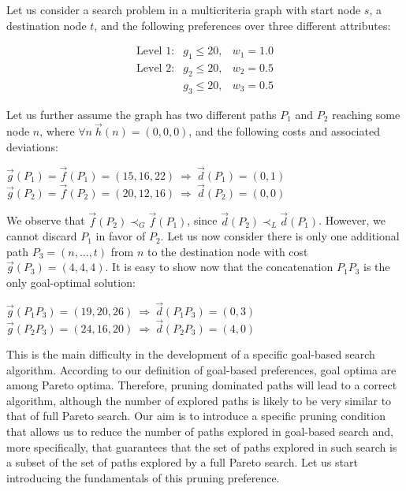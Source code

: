 \begin{ejemplo}\label{ej:ejemplo-pruning1}
Let us consider a search problem in a multicriteria graph with start node $s$, a destination node $t$, and the following preferences over three different attributes:

   \begin{equation}
     \begin{array}{ccc}
       \textrm{Level 1:} & g_{1} \leq 20, & w_1 = 1.0 \\
       \textrm{Level 2:} & g_{2} \leq 20, & w_2 = 0.5 \\ 
                         & g_{3} \leq 20, & w_3 = 0.5 
     \end{array}
   \end{equation}

   Let us further assume the graph has two different paths $P_{1}$ and $P_{2}$ reaching some node $n$, where $\forall n \ \vec{h}(n) = (0, 0, 0)$, and the following costs and associated deviations:

   \begin{center}
   $\vec{g}(P_{1}) = \vec{f}(P_{1}) = (15, 16, 22) \ \Rightarrow
     \ \vec{d}(P_{1}) = (0,1)$ \\ 
   $\vec{g}(P_{2}) = \vec{f}(P_{2}) = (20, 12, 16) \ \Rightarrow
     \ \vec{d}(P_{2}) = (0,0)$ \\ 
   \end{center}

   We observe that $\vec{f}(P_{2}) \prec_{G} \vec{f}(P_{1})$, since $\vec{d}(P_{2}) \prec_{L} \vec{d}(P_{1})$. However, we cannot discard $P_1$ in favor of $P_2$. Let us now consider there is only one additional path $P_{3} = (n, \ldots, t)$ from $n$ to the destination node with cost $\vec g(P_3) = (4, 4, 4)$. It is easy to show now that the concatenation $P_1P_3$ is the only goal-optimal solution:

   \begin{center}
   $\vec{g}(P_{1}P_3) = (19, 20, 26) \ \Rightarrow
     \ \vec{d}(P_{1}P_3) = (0,3)$ \\ 
   $\vec{g}(P_{2}P_3) = (24, 16, 20) \ \Rightarrow
     \ \vec{d}(P_{2}P_3) = (4,0)$ \\ 
   \end{center}
\end{ejemplo} 

This is the main difficulty in the development of a specific goal-based search algorithm. According to our definition of goal-based preferences, goal optima are among Pareto optima. Therefore, pruning dominated paths will lead to a correct algorithm, although the number of explored paths is likely to be very similar to that of full Pareto search. Our aim is to introduce a specific pruning condition that allows us to reduce the number of paths explored in goal-based search and, more specifically, that guarantees that the set of paths explored in such search is a subset of the set of paths explored by a full Pareto search. 
Let us start introducing the fundamentals of this pruning preference. 

